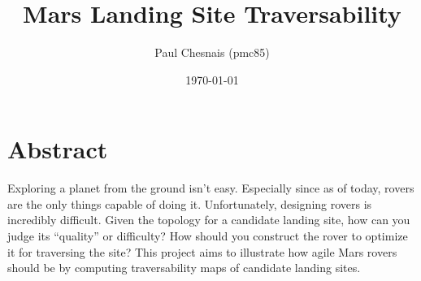 \documentclass[12pt]{article}
\title{Mars Landing Site Traversability}
\author{Paul Chesnais (pmc85)}
\date{\today}
\begin{document}
\maketitle
\thispagestyle{empty}

\section{Abstract}
\label{sec:abstract}
Exploring a planet from the ground isn't easy. Especially since as of today, rovers are the only things capable of doing it. Unfortunately, designing rovers is incredibly difficult. Given the topology for a candidate landing site, how can you judge its ``quality'' or difficulty? How should you construct the rover to optimize it for traversing the site? This project aims to illustrate how agile Mars rovers should be by computing traversability maps of candidate landing sites.
\end{document}
